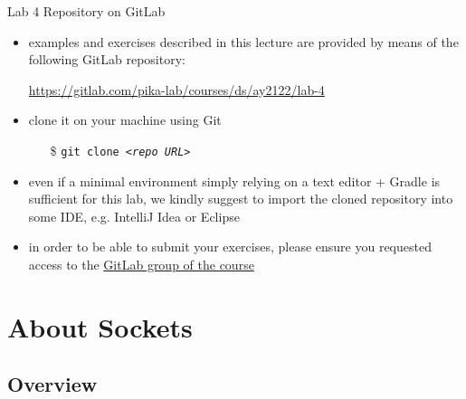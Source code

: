 \documentclass{beamer}\mode<presentation>{\usetheme{AMSBolognaFC}}
\newcommand{\labN}{4}
\newcommand{\labGroup}{https://gitlab.com/pika-lab/courses/ds/ay2122}
\newcommand{\labRepo}{\labGroup/lab-\labN}
\begin{document}
\begin{frame}[c]{Lab \labN{} Repository on GitLab}

	\begin{itemize}
		\item examples and exercises described in this lecture are provided by means of the following GitLab repository:
		\begin{center}
			\url{\labRepo}
		\end{center}

		\vfill

		\item clone it on your machine using Git
		\begin{itemize}
		    \item[\$] \texttt{git clone \textit{<repo URL>}}
		\end{itemize}

		\vfill

		\item even if a minimal environment simply relying on a text editor + Gradle is sufficient for this lab, we kindly suggest to import the cloned repository into some IDE, e.g. IntelliJ Idea or Eclipse

		\vfill

		\item in order to be able to submit your exercises, please ensure you requested access to the \href{\labGroup}{GitLab group of the course}
	\end{itemize}

\end{frame}

\section{About Sockets}

\subsection{Overview}
\end{document}

